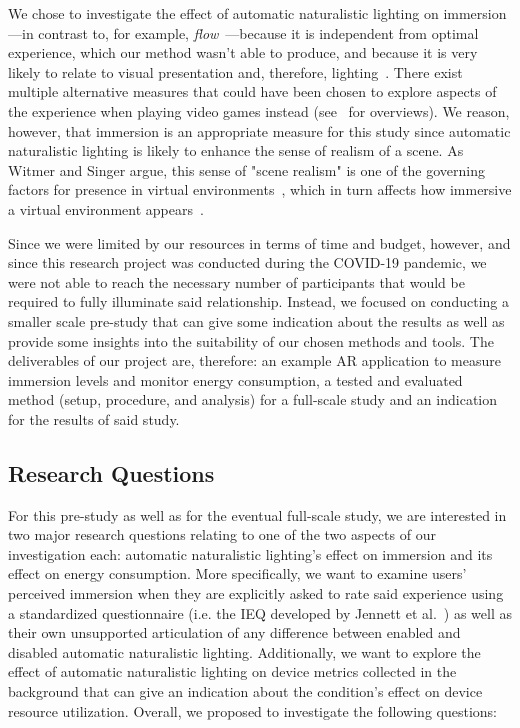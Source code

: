 \documentclass[12pt,twoside,english]{article}
\begin{document}
We chose to investigate the effect of automatic naturalistic lighting on immersion---in contrast to, for example, \textit{flow}~\cite{csikszentmihalyi_flow_1990}---because it is independent from optimal experience, which our method wasn't able to produce, and because it is very likely to relate to visual presentation and, therefore, lighting~\cite{jennett_measuring_2008}.
There exist multiple alternative measures that could have been chosen to explore aspects of the experience when playing video games instead (see~\cite{dey_systematic_2018, dunser_survey_2008} for overviews).
We reason, however, that immersion is an appropriate measure for this study since automatic naturalistic lighting is likely to enhance the sense of realism of a scene.
As Witmer and Singer argue, this sense of "scene realism" is one of the governing factors for presence in virtual environments~\cite{witmer_measuring_1998}, which in turn affects how immersive a virtual environment appears~\cite{jennett_measuring_2008}.

Since we were limited by our resources in terms of time and budget, however, and since this research project was conducted during the COVID-19 pandemic, we were not able to reach the necessary number of participants that would be required to fully illuminate said relationship.
Instead, we focused on conducting a smaller scale pre-study that can give some indication about the results as well as provide some insights into the suitability of our chosen methods and tools.
The deliverables of our project are, therefore: an example \gls{AR} application to measure immersion levels and monitor energy consumption, a tested and evaluated method (setup, procedure, and analysis) for a full-scale study and an indication for the results of said study.

\subsection{Research Questions}

For this pre-study as well as for the eventual full-scale study, we are interested in two major research questions relating to one of the two aspects of our investigation each: automatic naturalistic lighting's effect on immersion and its effect on energy consumption.
More specifically, we want to examine users' perceived immersion when they are explicitly asked to rate said experience using a standardized questionnaire (i.e. the \gls{IEQ} developed by Jennett et al.~\cite{jennett_measuring_2008}) as well as their own unsupported articulation of any difference between enabled and disabled automatic naturalistic lighting.
Additionally, we want to explore the effect of automatic naturalistic lighting on device metrics collected in the background that can give an indication about the condition's effect on device resource utilization.
Overall, we proposed to investigate the following questions:
\end{document}
